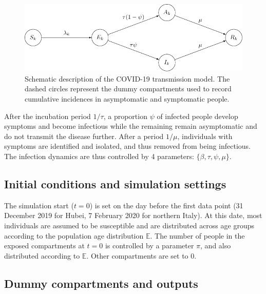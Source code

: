 \documentclass{article}
\begin{document}
	\begin{figure}[H]
		\centering
		\includegraphics[width=.7\linewidth]{../format_output/figures/fig_ode.pdf}
		\caption{Schematic description of the COVID-19 transmission model. The dashed circles represent the dummy compartments used to record cumulative incidences in asymptomatic and symptomatic people.}
		\label{fig:ode}
	\end{figure}
	
	After the incubation period $1/\tau$, a proportion $\psi$ of infected people develop symptoms and become infectious while the remaining remain asymptomatic and do not transmit the disease further. 
	After a period $1/\mu$, individuals with symptoms are identified and isolated, and thus removed from being infectious.
	The infection dynamics are thus controlled by 4 parameters: $\{\beta,\tau, \psi, \mu \}$.
	
	\subsection{Initial conditions and simulation settings}
	
	The simulation start ($t=0$) is set on the day before the first data point (31 December 2019 for Hubei, 7 February 2020 for northern Italy).
	At this date, most individuals are assumed to be susceptible and are distributed across age groups according to the population age distribution $\mathds{E}$.
	The number of people in the exposed compartments at $t=0$ is controlled by a parameter $\pi$, and also distributed according to $\mathds{E}$.
	Other compartments are set to 0.
	
	\subsection{Dummy compartments and outputs}
	
\end{document}
